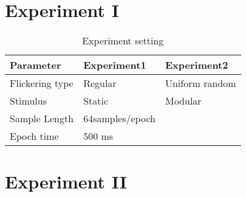 \section{Experiment I}
\begin{table}[ht]
\centering
\begin{tabular}{| m{.4\linewidth} | m{.4\linewidth} | m{.4\linewidth} |}
			
			\hline 
			\textbf{Parameter} & \textbf{Experiment1}  & \textbf{Experiment2}\\
			\hline 
			Flickering type & Regular & Uniform random   \\
			\hline 
			Stimulus & Static & Modular  \\
			\hline 
			Sample Length & 64samples/epoch \\
			\hline 
			Epoch time & 500 ms \\
			\hline
		\end{tabular}
        
\caption{Experiment setting}
\label{table:2}
\end{table}

\section{Experiment II}

